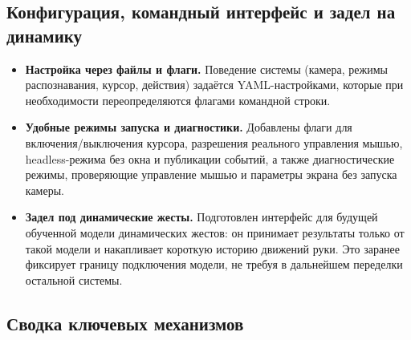 \documentclass[11pt,a4paper]{article}
\begin{document}
\subsection{Конфигурация, командный интерфейс и задел на динамику}

\begin{itemize}[leftmargin=1.4em]
  \item \textbf{Настройка через файлы и флаги.} Поведение системы (камера, режимы распознавания,
        курсор, действия) задаётся YAML-настройками, которые при необходимости переопределяются
        флагами командной строки.
  \item \textbf{Удобные режимы запуска и диагностики.} Добавлены флаги для включения/выключения
        курсора, разрешения реального управления мышью, headless-режима без окна и публикации
        событий, а также диагностические режимы, проверяющие управление мышью и параметры экрана
        без запуска камеры.
  \item \textbf{Задел под динамические жесты.} Подготовлен интерфейс для будущей обученной модели
        динамических жестов: он принимает результаты только от такой модели и накапливает короткую
        историю движений руки. Это заранее фиксирует границу подключения модели, не требуя в
        дальнейшем переделки остальной системы.
\end{itemize}

\subsection{Сводка ключевых механизмов}
\end{document}
